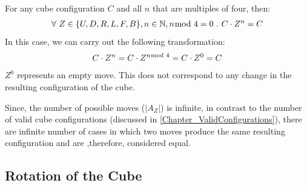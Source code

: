 \documentclass[12pt,a4paper]{article}
\theoremstyle{custom}
\begin{document}
For any cube configuration $C$ and all $n$ that are multiples of four, then:
\begin{align*}
\forall \ Z \in \{U, D, R, L, F, B\}, n \in \mathbb{N}, n \hspace*{-0.6em} \mod 4 = 0 \ . \
C \cdot Z^n
= C
\end{align*}
In this case, we can carry out the following transformation:
\begin{align*}
C \cdot Z^n
= C \cdot Z^{n \hspace*{-0.5em} \mod 4}
= C \cdot Z^0
= C
\end{align*}
$Z^0$ represents an empty move. This does not correspond to any change in the resulting configuration of the cube.

Since, the number of possible moves ($|A_Z|$) is infinite, in contrast to the number of valid cube configurations (discussed in \ref{Chapter_ValidConfigurations}), there are infinite number of cases in which two moves produce the same resulting configuration and are ,therefore, considered equal. 

\subsection{Rotation of the Cube}

\label{Section_RotationOfCube}
\end{document}
